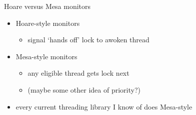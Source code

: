 \begin{frame}{Hoare versus Mesa monitors}
\begin{itemize}
\item Hoare-style monitors
    \begin{itemize}
    \item signal `hands off' lock to awoken thread
    \end{itemize}
\item Mesa-style monitors
    \begin{itemize}
    \item any eligible thread gets lock next
    \item (maybe some other idea of priority?)
    \end{itemize}
\vspace{.5cm}
\item every current threading library I know of does Mesa-style
\end{itemize}
\end{frame}
